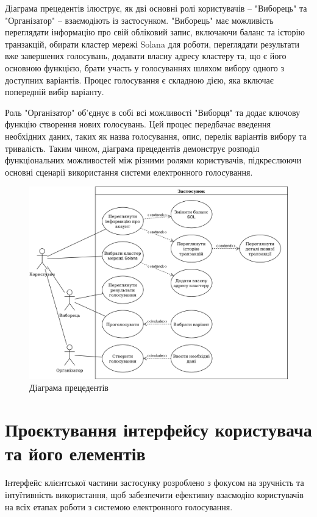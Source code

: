 \documentclass[14pt]{extreport}
\begin{document}
Діаграма прецедентів ілюструє, як дві основні ролі користувачів – "Виборець" та "Організатор" – взаємодіють із застосунком. "Виборець" має можливість переглядати інформацію про свій обліковий запис, включаючи баланс та історію транзакцій, обирати кластер мережі Solana для роботи, переглядати результати вже завершених голосувань, додавати власну адресу кластеру та, що є його основною функцією, брати участь у голосуваннях шляхом вибору одного з доступних варіантів. Процес голосування є складною дією, яка включає попередній вибір варіанту.

Роль "Організатор" об'єднує в собі всі можливості "Виборця" та додає ключову функцію створення нових голосувань. Цей процес передбачає введення необхідних даних, таких як назва голосування, опис, перелік варіантів вибору та тривалість. Таким чином, діаграма прецедентів демонструє розподіл функціональних можливостей між різними ролями користувачів, підкреслюючи основні сценарії використання системи електронного голосування.

  \begin{figure}[H]
    \centering
    \includegraphics[scale=0.18]{UMLUseCase}
    \caption{Діаграма прецедентів}
    \label{fig:UMLUseCase}
  \end{figure}
  
  \section{Проєктування інтерфейсу користувача та його елементів}
  
  Інтерфейс клієнтської частини застосунку розроблено з фокусом на зручність та інтуїтивність використання, щоб забезпечити ефективну взаємодію користувачів на всіх етапах роботи з системою електронного голосування.
\end{document}
